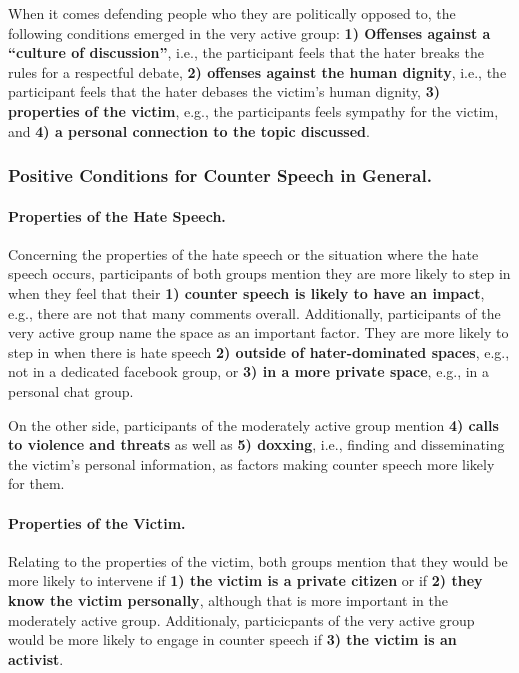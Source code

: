 \documentclass[runningheads]{llncs}
\begin{document}
When it comes defending people who they are politically opposed to, the following conditions emerged in the very active group: \textbf{1) Offenses against a \enquote{culture of discussion}}, i.e., the participant feels that the hater breaks the rules for a respectful debate, \textbf{2) offenses against the human dignity}, i.e., the participant feels that the hater debases the victim's human dignity, \textbf{3) properties of the victim}, e.g., the participants feels sympathy for the victim, and
\textbf{4) a personal connection to the topic discussed}.

\hypertarget{positive-conditions-for-counter-speech-in-general.}{%
\subsubsection{Positive Conditions for Counter Speech in General.}\label{positive-conditions-for-counter-speech-in-general.}}

\hypertarget{properties-of-the-hate-speech.}{%
\paragraph{Properties of the Hate Speech.}\label{properties-of-the-hate-speech.}}

Concerning the properties of the hate speech or the situation where the hate speech occurs, participants of both groups mention they are more likely to step in when they feel that their \textbf{1) counter speech is likely to have an impact}, e.g., there are not that many comments overall.
Additionally, participants of the very active group name the space as an important factor. They are more likely to step in when there is hate speech \textbf{2) outside of hater-dominated spaces}, e.g., not in a dedicated facebook group, or
\textbf{3) in a more private space}, e.g., in a personal chat group.

On the other side, participants of the moderately active group mention \textbf{4) calls to violence and threats} as well as
\textbf{5) doxxing}, i.e., finding and disseminating the victim's personal information,
as factors making counter speech more likely for them.

\hypertarget{properties-of-the-victim.}{%
\paragraph{Properties of the Victim.}\label{properties-of-the-victim.}}

Relating to the properties of the victim, both groups mention that they would be more likely to intervene if
\textbf{1) the victim is a private citizen} or if \textbf{2) they know the victim personally}, although that is more important in the moderately active group.
Additionaly, particicpants of the very active group would be more likely to engage in counter speech if \textbf{3) the victim is an activist}.
\end{document}
